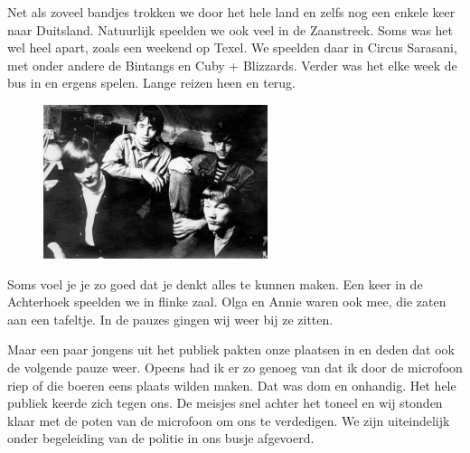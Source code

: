 \documentclass[12pt,twoside, openright]{memoir}
\begin{document}
Net als zoveel bandjes trokken we door het hele land en zelfs nog een enkele keer naar Duitsland. Natuurlijk speelden we ook veel in de Zaanstreek. Soms was het wel heel apart, zoals een weekend op Texel. We speelden daar in Circus Sarasani, met onder andere de Bintangs en Cuby + Blizzards. Verder was het elke week de bus in en ergens spelen. Lange reizen heen en terug.

\begin{figure}
\centering
\includegraphics[width=\textwidth]{img/ch30/optournee2a}
\end{figure}

Soms voel je je zo goed dat je denkt alles te kunnen maken. Een keer in de Achterhoek speelden we in flinke zaal. Olga en Annie waren ook mee, die zaten aan een tafeltje. In de pauzes gingen wij weer bij ze zitten. 

Maar een paar jongens uit het publiek pakten onze plaatsen in en deden dat ook de volgende pauze weer. Opeens had ik er zo genoeg van dat ik door de microfoon riep of die boeren eens plaats wilden maken. Dat was dom en onhandig. Het hele publiek keerde zich tegen ons. De meisjes snel achter het toneel en wij stonden klaar met de poten van de microfoon om ons te verdedigen. We zijn uiteindelijk onder begeleiding van de politie in ons busje afgevoerd.
\end{document}

